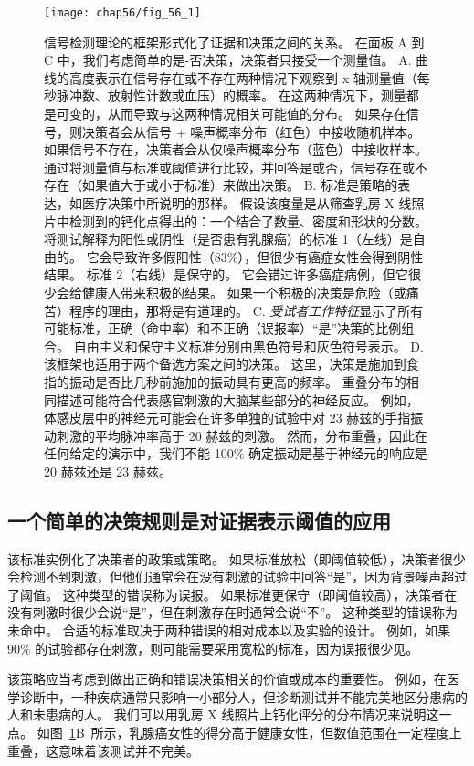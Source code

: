 \begin{figure}[htbp]
	\centering
	\texttt{[image: chap56/fig\_56\_1]}
	\caption{信号检测理论的框架形式化了证据和决策之间的关系。
		在面板 A 到 C 中，我们考虑简单的是-否决策，决策者只接受一个测量值。
		A. 曲线的高度表示在信号存在或不存在两种情况下观察到 x 轴测量值（每秒脉冲数、放射性计数或血压）的概率。
		在这两种情况下，测量都是可变的，从而导致与这两种情况相关可能值的分布。
		如果存在信号，则决策者会从信号 + 噪声概率分布（红色）中接收随机样本。
		如果信号不存在，决策者会从仅噪声概率分布（蓝色）中接收样本。
		通过将测量值与标准或阈值进行比较，并回答是或否，信号存在或不存在（如果值大于或小于标准）来做出决策。
		B. 标准是策略的表达，如医疗决策中所说明的那样。
		假设该度量是从筛查乳房 X 线照片中检测到的钙化点得出的：一个结合了数量、密度和形状的分数。
		将测试解释为阳性或阴性（是否患有乳腺癌）的标准 1（左线）是自由的。
		它会导致许多假阳性（83\%），但很少有癌症女性会得到阴性结果。
		标准 2（右线）是保守的。
		它会错过许多癌症病例，但它很少会给健康人带来积极的结果。
		如果一个积极的决策是危险（或痛苦）程序的理由，那将是有道理的。
		C. \textit{受试者工作特征}显示了所有可能标准，正确（命中率）和不正确（误报率）“是”决策的比例组合。
		自由主义和保守主义标准分别由黑色符号和灰色符号表示。
		D. 该框架也适用于两个备选方案之间的决策。
		这里，决策是施加到食指的振动是否比几秒前施加的振动具有更高的频率。
		重叠分布的相同描述可能符合代表感官刺激的大脑某些部分的神经反应。
		例如，体感皮层中的神经元可能会在许多单独的试验中对 23 赫兹的手指振动刺激的平均脉冲率高于 20 赫兹的刺激。
		然而，分布重叠，因此在任何给定的演示中，我们不能 100\% 确定振动是基于神经元的响应是 20 赫兹还是 23 赫兹。}
	\label{fig:56_1}
\end{figure}


\subsection{一个简单的决策规则是对证据表示阈值的应用}

该标准实例化了决策者的政策或策略。
如果标准放松（即阈值较低），决策者很少会检测不到刺激，但他们通常会在没有刺激的试验中回答“是”，因为背景噪声超过了阈值。
这种类型的错误称为误报。
如果标准更保守（即阈值较高），决策者在没有刺激时很少会说“是”，但在刺激存在时通常会说“不”。
这种类型的错误称为未命中。
合适的标准取决于两种错误的相对成本以及实验的设计。
例如，如果 90\% 的试验都存在刺激，则可能需要采用宽松的标准，因为误报很少见。


该策略应当考虑到做出正确和错误决策相关的价值或成本的重要性。
例如，在医学诊断中，一种疾病通常只影响一小部分人，但诊断测试并不能完美地区分患病的人和未患病的人。
我们可以用乳房 X 线照片上钙化评分的分布情况来说明这一点。
如图~\ref{fig:56_1}B~所示，乳腺癌女性的得分高于健康女性，但数值范围在一定程度上重叠，这意味着该测试并不完美。


